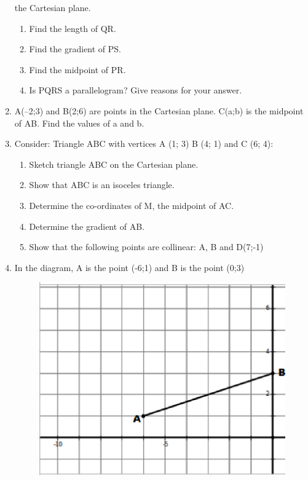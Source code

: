 \begin{enumerate}[noitemsep, label=\textbf{\arabic*}. ]
the Cartesian plane.
\begin{enumerate}[noitemsep, label=\textbf{\alph*}. ] 
\item Find the length of QR.\item Find the gradient of PS.\item Find the
midpoint of PR.\item Is PQRS a parallelogram?  Give reasons for your answer.
\end{enumerate}
  \item A(--2;3) and B(2;6) are points in the Cartesian plane.  C(a;b) is the
midpoint of AB. Find the values of a and b.\newline
\item 
Consider: Triangle ABC with vertices A (1; 3) B (4; 1) and C (6; 4):
\begin{enumerate}[noitemsep, label=\textbf{\alph*}. ] 
\item Sketch triangle ABC on the Cartesian plane. \item Show that ABC is an
isoceles triangle.\item Determine the co-ordinates of M, the midpoint of
AC.\item Determine the gradient of AB.\item Show that the following points are
collinear: A, B and D(7;-1)\end{enumerate}
\item In the diagram, A is the point (-6;1) and B is the point (0;3)
\setcounter{subfigure}{0}
\begin{figure}[H] %
\begin{center}
\label{m39358*id740344!!!underscore!!!media}\label{
m39358*id740344!!!underscore!!!printimage}\includegraphics[width=.7\columnwidth]
{col11306.imgs/m39358_MG10C14_5.png} %

\end{center}
\end{figure}
\end{enumerate}
